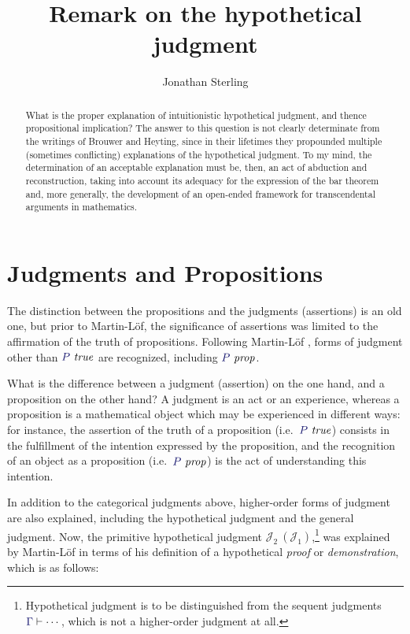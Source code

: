 \documentclass[11pt]{amsart}
\theoremstyle{definition}
\theoremstyle{remark}
\numberwithin{equation}{section}
\def\InputModeColorName{MidnightBlue}
\newcommand\InputMode[1]{{\color{\InputModeColorName}{#1}}}
\newcommand\HypJ[2]{#1\ (#2)}
\newcommand\JJ{\mathcal{J}}
\newcommand\IsTrue[1]{\InputMode{#1}\ \mathit{true}}
\newcommand\IsProp[1]{\InputMode{#1}\ \mathit{prop}}
\newcommand\Seq[2]{\InputMode{#1}\vdash #2}
\begin{document}
\title{Remark on the hypothetical judgment}

\author{Jonathan Sterling}
\address{}

\onehalfspacing

\begin{abstract}

What is the proper explanation of intuitionistic hypothetical judgment, and
thence propositional implication? The answer to this question is not clearly
determinate from the writings of Brouwer and Heyting, since in their lifetimes
they propounded multiple (sometimes conflicting) explanations of the
hypothetical judgment. To my mind, the determination of an acceptable
explanation must be, then, an act of abduction and reconstruction, taking
into account its adequacy for the expression of the bar theorem and, more
generally, the development of an open-ended framework for transcendental
arguments in mathematics.

\end{abstract}

\maketitle

\section{Judgments and Propositions}

The distinction between the propositions and the judgments (assertions) is an
old one, but prior to Martin-L\"of, the significance of assertions was limited
to the affirmation of the truth of propositions. Following Martin-L\"of
\cite{siena.lectures}, forms of judgment other than $\IsTrue{P}$ are recognized,
including $\IsProp{P}$.

What is the difference between a judgment (assertion) on the one hand, and a
proposition on the other hand? A judgment is an act or an experience, whereas a
proposition is a mathematical object which may be experienced in different ways:
for instance, the assertion of the truth of a proposition (i.e.\ $\IsTrue{P}$)
consists in the fulfillment of the intention expressed by the proposition, and
the recognition of an object as a proposition (i.e.\ $\IsProp{P}$) is the act of
understanding this intention.

In addition to the categorical judgments above, higher-order forms of judgment
are also explained, including the hypothetical judgment and the general
judgment. Now, the primitive hypothetical judgment
$\HypJ{\JJ_2}{\JJ_1}$,\footnote{Hypothetical judgment is to be distinguished
from the sequent judgments $\Seq{\Gamma}{\cdots}$, which is not a higher-order
judgment at all.} was explained by Martin-L\"of in terms of his definition of a
hypothetical \emph{proof} or \emph{demonstration}, which is as follows:
\end{document}
